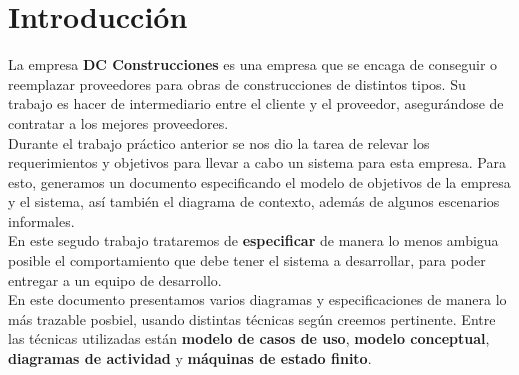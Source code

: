 \section{Introducción}
La empresa \textbf{DC Construcciones} es una empresa que se encaga de conseguir o 
reemplazar proveedores para obras de construcciones de distintos tipos. Su trabajo 
es hacer de intermediario entre el cliente y el proveedor, asegurándose de contratar 
a los mejores proveedores. \\

Durante el trabajo práctico anterior se nos dio la tarea de relevar los requerimientos 
y objetivos para llevar a cabo un sistema para esta empresa. Para esto, generamos 
un documento especificando el modelo de objetivos de la empresa y el sistema, así también 
el diagrama de contexto, además de algunos escenarios informales. \\

En este segudo trabajo trataremos de \textbf{especificar} de manera lo menos ambigua posible 
el comportamiento que debe tener el sistema a desarrollar, para poder entregar a un 
equipo de desarrollo. \\

En este documento presentamos varios diagramas y especificaciones de manera lo más 
trazable posbiel, usando distintas técnicas según creemos pertinente. 
Entre las técnicas utilizadas están \textbf{modelo de casos de uso}, \textbf{modelo conceptual}, 
\textbf{diagramas 
de actividad} y \textbf{máquinas de estado finito}. 
